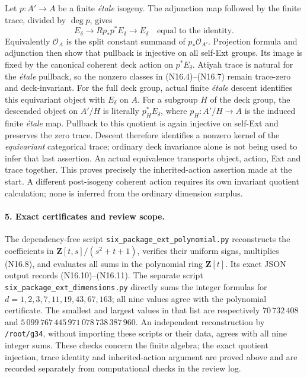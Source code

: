 Let $p:A'\to A$ be a finite \emph{\'etale} isogeny. The adjunction
map followed by the finite trace, divided by $\deg p$, gives
\[
 E_\delta\longrightarrow Rp_*p^*E_\delta
                         \longrightarrow E_\delta
                         \quad\text{equal to the identity}.
\]
Equivalently $\mathcal O_A$ is the split constant summand of
$p_*\mathcal O_{A'}$. Projection formula and adjunction then
show that pullback is injective on all self-Ext groups.
Its image is fixed by the canonical coherent deck action on
$p^*E_\delta$. Atiyah trace is natural for the \emph{\'etale}
pullback, so the nonzero classes in (N16.4)--(N16.7) remain
trace-zero and deck-invariant. For the full deck group, actual
finite \emph{\'etale} descent identifies this equivariant object
with $E_\delta$ on $A$. For a subgroup $H$ of the deck group,
the descended object on $A'/H$ is literally $p_H^*E_\delta$,
where $p_H:A'/H\to A$ is the induced finite \emph{\'etale}
map. Pullback to this quotient is again injective on self-Ext
and preserves the zero trace. Descent therefore identifies a
nonzero kernel of the \emph{equivariant} categorical trace;
ordinary deck invariance alone is not being used to infer that
last assertion. An actual equivalence transports object, action,
Ext and trace together.
This proves precisely the inherited-action assertion made at
the start. A different post-isogeny coherent action requires
its own invariant quotient calculation; none is inferred
from the ordinary dimension surplus.

\paragraph{5. Exact certificates and review scope.}
The dependency-free script
\texttt{six\_\allowbreak package\_\allowbreak ext\_\allowbreak polynomial.py}
reconstructs the
coefficients in $\mathbf Z[t,s]/(s^2+t+1)$, verifies their
uniform signs, multiplies (N16.8), and evaluates all sums in
the polynomial ring $\mathbf Z[t]$. Its exact JSON output
records (N16.10)--(N16.11). The separate script
\texttt{six\_\allowbreak package\_\allowbreak ext\_\allowbreak dimensions.py}
directly sums the
integer formulas for
$d=1,2,3,7,11,19,43,67,163$; all nine values agree with the
polynomial certificate. The smallest and largest values in
that list are respectively $70\,732\,408$ and
$5\,099\,767\,445\,971\,078\,738\,387\,960$.
An independent reconstruction by \texttt{/root/g34}, without
importing these scripts or their data, agrees with all nine
integer sums. These checks concern the finite algebra; the
exact quotient injection, trace identity and inherited-action
argument are proved above and are recorded separately from
computational checks in the review log.
